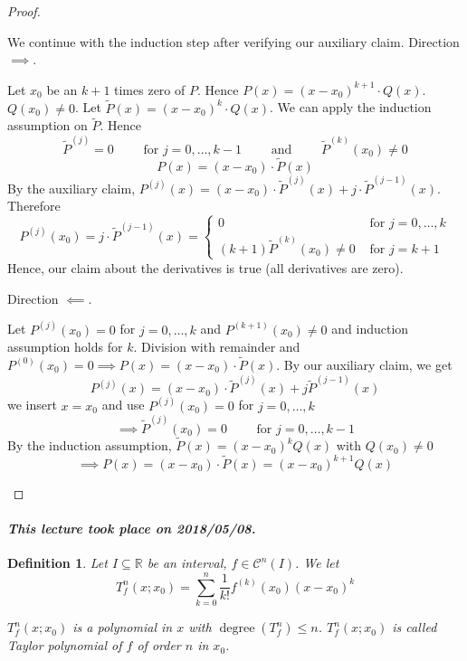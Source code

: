\documentclass{article}
\newtheorem{definition}{Definition}  \numberwithin{definition}{section}
\newcommand{\dateref}[1]{\paragraph{\textit{This lecture took place on #1.}}}
\begin{document}
\begin{proof}
\begin{description}
      We continue with the induction step after verifying our auxiliary claim. Direction $\implies$.

      Let $x_0$ be an $k+1$ times zero of $P$. Hence $P(x) = (x - x_0)^{k+1} \cdot Q(x)$. $Q(x_0) \neq 0$.
      Let $\tilde P(x) = (x - x_0)^k \cdot Q(x)$. 
      We can apply the induction assumption on $\tilde P$. Hence
      \[ \tilde P^{(j)} = 0 \qquad \text{ for } j = 0, \ldots, k-1 \qquad \text{ and } \qquad \tilde P^{(k)}(x_0) \neq 0 \]
      \[ P(x) = (x - x_0) \cdot \tilde P(x) \]
      By the auxiliary claim, $P^{(j)}(x) = (x - x_0) \cdot \tilde P^{(j)}(x) + j \cdot \tilde P^{(j-1)}(x)$.
      Therefore
      \[
        P^{(j)}(x_0) = j \cdot \tilde P^{(j-1)}(x) = \begin{cases}
          0 & \text{ for } j = 0, \dots, k \\
          (k+1)\tilde P^{(k)}(x_0) \neq 0 & \text{ for } j = k+1
        \end{cases}
      \]
      Hence, our claim about the derivatives is true (all derivatives are zero).

      Direction $\impliedby$.

      Let $P^{(j)}(x_0) = 0$ for $j = 0, \dots, k$ and $P^{(k+1)}(x_0) \neq 0$ and induction assumption holds for $k$.
      Division with remainder and $P^{(0)}(x_0) = 0 \implies P(x) = (x - x_0) \cdot \tilde P(x)$.
      By our auxiliary claim, we get
      \[ P^{(j)}(x) = (x - x_0) \cdot \tilde P^{(j)}(x) + j \tilde P^{(j-1)}(x) \]
      we insert $x = x_0$ and use $P^{(j)}(x_0) = 0$ for $j = 0, \dots, k$
      \[ \implies \tilde P^{(j)}(x_0) = 0 \qquad \text{ for } j = 0, \dots, k-1 \]
      By the induction assumption, $\tilde P(x) = (x - x_0)^k Q(x)$ with $Q(x_0) \neq 0$
      \[ \implies P(x) = (x - x_0) \cdot \tilde P(x) = (x - x_0)^{k+1} Q(x) \]
  \end{description}
\end{proof}

\dateref{2018/05/08}

\begin{definition} %
  \label{def3}
  Let $I \subseteq \mathbb R$ be an interval, $f \in \mathcal C^n(I)$.
  We let
  \[ T_f^n(x; x_0) = \sum_{k=0}^n \frac{1}{k!} f^{(k)}(x_0) (x - x_0)^k \]

  $T_f^n(x; x_0)$ is a polynomial in $x$ with $\operatorname{degree}(T_f^n) \leq n$.
  $T_f^n(x; x_0)$ is called \emph{Taylor polynomial of $f$ of order $n$ in $x_0$}.
\end{definition}
\end{document}
